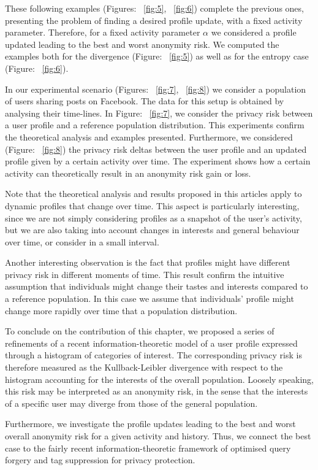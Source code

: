 These following examples (Figures: ~\ref{fig:5}, ~\ref{fig:6}) complete the previous ones, presenting the problem of finding a desired profile update, with a fixed activity parameter. Therefore, for a fixed activity parameter $\alpha$ we considered a profile updated leading to the best and worst anonymity risk. We computed the examples both for the divergence (Figure: ~\ref{fig:5}) as well as for the entropy case (Figure: ~\ref{fig:6}). 

In our experimental scenario (Figures: ~\ref{fig:7}, ~\ref{fig:8}) we consider a population of users sharing posts on Facebook. The data for this setup is obtained by analysing their time-lines. In Figure: ~\ref{fig:7}, we consider the privacy risk between a user profile and a reference population distribution. This experiments confirm the theoretical analysis and examples presented. Furthermore, we considered (Figure: ~\ref{fig:8}) the privacy risk deltas between the user profile and an updated profile given by a certain activity over time. The experiment shows how a certain activity can theoretically result in an anonymity risk gain or loss.

Note that the theoretical analysis and results proposed in this articles apply to dynamic profiles that change over time. This aspect is particularly interesting, since we are not simply considering profiles as a snapshot of the user's activity, but we are also taking into account changes in interests and general behaviour over time, or consider in a small interval.

Another interesting observation is the fact that profiles might have different privacy risk in different moments of time. This result confirm the intuitive assumption that individuals might change their tastes and interests compared to a reference population. In this case we assume that individuals' profile might change more rapidly over time that a population distribution.

To conclude on the contribution of this chapter, we proposed a series of refinements of a recent information-theoretic model of a user profile expressed through a histogram of categories of interest. The corresponding privacy risk is therefore measured as the Kullback-Leibler divergence with respect to the histogram accounting for the interests of the overall population. Loosely speaking, this risk may be interpreted as an anonymity risk, in the sense that the interests of a specific user may diverge from those of the general population.

Furthermore, we investigate the profile updates leading to the best and worst overall anonymity risk for a given activity and history. Thus, we connect the best case to the fairly recent information-theoretic framework of optimised query forgery and tag suppression for privacy protection.

